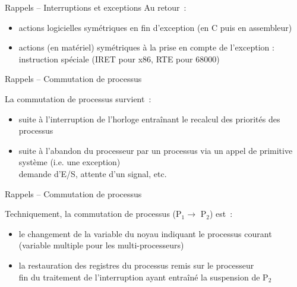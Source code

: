 \begin {frame} {Rappels -- Interruptions et exceptions}
    Au retour~:

    \begin {itemize}
	\item actions logicielles symétriques en fin d'exception (en
	    C puis en assembleur)

	\item actions (en matériel) symétriques à la prise en compte
	    de l'exception : instruction spéciale (IRET pour x86,
	    RTE pour 68000)

    \end {itemize}
\end {frame}

\begin {frame} {Rappels -- Commutation de processus}

    La commutation de processus survient~:
    \begin {itemize}
	\item suite à l'interruption de l'horloge entraînant le recalcul
	    des priorités des processus

	\item suite à l'abandon du processeur par un processus via
	    un appel de primitive système (i.e. une exception) \\
	    \implique demande d'E/S, attente d'un signal, etc.
    \end {itemize}

    \vspace* {3mm}
\end {frame}

\begin {frame} {Rappels -- Commutation de processus}

    Techniquement, la commutation de processus (P$_1 \rightarrow$ P$_2$) est~:
    \begin {itemize}
	\item le changement de la variable du noyau indiquant
	    le processus courant \\
	    (variable multiple pour les multi-processeurs)

	\item la restauration des registres du processus remis
	    sur le processeur \\
	    \implique fin du traitement de l'interruption ayant
	    entraîné la suspension de P$_2$

    \end {itemize}

\end {frame}

